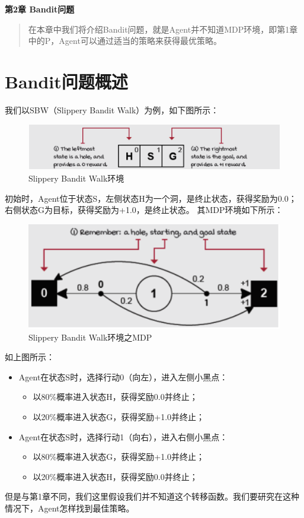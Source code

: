 \newpage
\maketitle
\begin{center}
\Large \textbf{第2章 Bandit问题} \quad 
\end{center}
\begin{abstract}
在本章中我们将介绍Bandit问题，就是Agent并不知道MDP环境，即第1章中的P，Agent可以通过适当的策略来获得最优策略。
\end{abstract}
\section{Bandit问题概述}
我们以SBW（Slippery Bandit Walk）为例，如下图所示：
\begin{figure}[H]
	\caption{Slippery Bandit Walk环境}
	\label{p000012}
	\centering
	\includegraphics[width=15cm]{images/p000012}
\end{figure}
初始时，Agent位于状态S，左侧状态H为一个洞，是终止状态，获得奖励为0.0；右侧状态G为目标，获得奖励为+1.0，是终止状态。
其MDP环境如下所示：
\begin{figure}[H]
	\caption{Slippery Bandit Walk环境之MDP}
	\label{p000013}
	\centering
	\includegraphics[width=15cm]{images/p000013}
\end{figure}
如上图所示：
\begin{itemize}
    \item Agent在状态S时，选择行动0（向左），进入左侧小黑点：
    \begin{itemize}
        \item 以80\%概率进入状态H，获得奖励0.0并终止；
        \item 以20\%概率进入状态G，获得奖励+1.0并终止；
    \end{itemize}
    \item Agent在状态S时，选择行动1（向右），进入右侧小黑点：
    \begin{itemize}
        \item 以80\%概率进入状态G，获得奖励+1.0并终止；
        \item 以20\%概率进入状态H，获得奖励0.0并终止；
    \end{itemize}
\end{itemize}
但是与第1章不同，我们这里假设我们并不知道这个转移函数。我们要研究在这种情况下，Agent怎样找到最佳策略。
